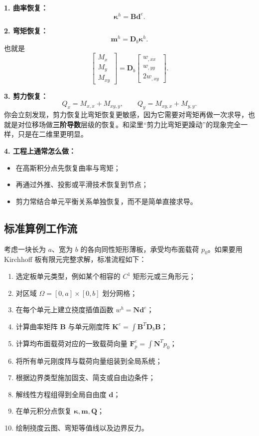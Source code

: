 \documentclass[11pt, a4paper, UTF8]{ctexart}
\begin{document}
\textbf{1. 曲率恢复：}
\[
\bm{\kappa}^h = \bm{B}\bm{d}^e.
\]

\textbf{2. 弯矩恢复：}
\[
\bm{m}^h = \bm{D}_b \bm{\kappa}^h.
\]
也就是
\[
\begin{bmatrix}
M_x \\ M_y \\ M_{xy}
\end{bmatrix}
=
\bm{D}_b
\begin{bmatrix}
w_{,xx} \\ w_{,yy} \\ 2w_{,xy}
\end{bmatrix}.
\]

\textbf{3. 剪力恢复：}
\[
Q_x = M_{x,x} + M_{xy,y},
\qquad
Q_y = M_{xy,x} + M_{y,y}.
\]
你会立刻发现，剪力恢复比弯矩恢复更敏感，因为它需要对弯矩再做一次求导，也就是对位移场做\textbf{三阶导数}层级的恢复。和梁里“剪力比弯矩更躁动”的现象完全一样，只是在二维里更明显。

\textbf{4. 工程上通常怎么做：}
\begin{itemize}
    \item 在高斯积分点先恢复曲率与弯矩；
    \item 再通过外推、投影或平滑技术恢复到节点；
    \item 剪力常结合单元平衡关系单独恢复，而不是简单直接求导。
\end{itemize}

\subsection{标准算例工作流}
考虑一块长为 $a$、宽为 $b$ 的各向同性矩形薄板，承受均布面载荷 $p_0$。如果要用 Kirchhoff 板有限元完整求解，标准流程如下：
\begin{enumerate}
    \item 选定板单元类型，例如某个相容的 $C^1$ 矩形元或三角形元；
    \item 对区域 $\Omega=[0,a]\times[0,b]$ 划分网格；
    \item 在每个单元上建立挠度插值函数 $w^h=\bm{N}\bm{d}^e$；
    \item 计算曲率矩阵 $\bm{B}$ 与单元刚度阵 $\bm{K}^e=\int \bm{B}^T\bm{D}_b\bm{B}$；
    \item 计算均布面载荷对应的一致载荷向量 $\bm{F}^e_p=\int \bm{N}^Tp_0$；
    \item 将所有单元刚度阵与载荷向量组装到全局系统；
    \item 根据边界类型施加固支、简支或自由边条件；
    \item 解线性方程组得到全局自由度 $\bm{d}$；
    \item 在单元积分点恢复 $\bm{\kappa},\bm{m},\bm{Q}$；
    \item 绘制挠度云图、弯矩等值线以及边界反力。
\end{enumerate}
\end{document}
